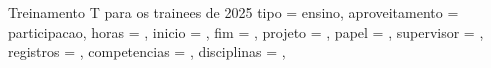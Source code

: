 \begin{atividade}{Treinamento T para os trainees de 2025}{
  tipo         = ensino,
  aproveitamento = participacao,   %
  horas        = {},   %
  inicio       = {},   %
  fim          = {},   %
  projeto      = {},
  papel        = {},   %
  supervisor   = {},   %
  registros    = {},   %
  competencias = {},   %
  disciplinas  = {},   %
}

\begin{contexto}
\end{contexto}

\begin{contribuicao}
\end{contribuicao}

\begin{desenvolvimento}


\end{desenvolvimento}
\end{atividade}
